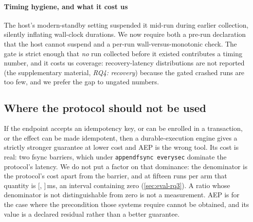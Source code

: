 \paragraph{Timing hygiene, and what it cost us} The host's modern-standby
setting suspended it mid-run during earlier collection, silently inflating
wall-clock durations. We now require both a pre-run declaration that the host
cannot suspend and a per-run wall-versus-monotonic check. The gate is strict
enough that \emph{no} run collected before it existed contributes a timing
number, and it costs us coverage: recovery-latency distributions are not
reported (the supplementary material, \emph{RQ4: recovery}) because the
gated crashed runs are too few, and
we prefer the gap to ungated numbers.

\subsection{Where the protocol should not be used}

If the endpoint accepts an idempotency key, or can be enrolled in a
transaction, or the effect can be made idempotent, then a durable-execution
engine gives a strictly stronger guarantee at lower cost and AEP is the wrong
tool. Its cost is real: two fsync barriers, which under \texttt{appendfsync
everysec} dominate the protocol's latency. We do not put a factor on that
dominance: the denominator is the protocol's cost apart from the barrier, and
at fifteen runs per arm that quantity is
[\ProtocolMinusBarrierFifteenLow{}, \ProtocolMinusBarrierFifteenHigh{}]\,ms,
an interval containing zero (\cref{sec:eval-rq3}). A ratio whose denominator
is not distinguishable from zero is not a measurement. AEP is for the case where the precondition those systems
require cannot be obtained, and its value is a declared residual rather than a
better guarantee.
